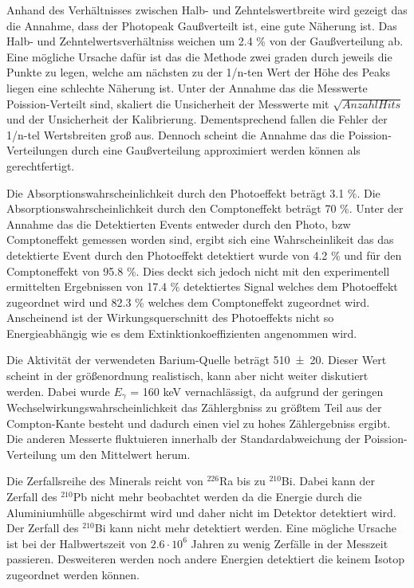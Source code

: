 Anhand des Verhältnisses zwischen Halb- und Zehntelswertbreite wird gezeigt das die Annahme, dass der Photopeak Gaußverteilt ist, eine gute Näherung ist. Das Halb- und Zehntelwertsverhältniss weichen um 2.4 \% von der Gaußverteilung ab. Eine mögliche Ursache dafür ist das die Methode zwei graden durch jeweils die Punkte zu legen, welche am nächsten zu der 1/n-ten Wert der Höhe des Peaks liegen eine schlechte Näherung ist. Unter der Annahme das die Messwerte Poission-Verteilt sind, skaliert die Unsicherheit der Messwerte mit $\sqrt{Anzahl Hits}$ und der Unsicherheit der Kalibrierung. Dementsprechend fallen die Fehler der 1/n-tel Wertsbreiten groß aus. Dennoch scheint die Annahme das die Poission-Verteilungen durch eine Gaußverteilung approximiert werden können als gerechtfertigt. 

Die Absorptionswahrscheinlichkeit durch den Photoeffekt beträgt 3.1 \%. Die Absorptionswahrscheinlichkeit durch den Comptoneffekt beträgt 70 \%. Unter der Annahme das die Detektierten Events entweder durch den Photo, bzw Comptoneffekt gemessen worden sind, ergibt sich eine Wahrscheinlikeit das das detektierte Event durch den Photoeffekt detektiert wurde von 4.2 \% und für den Comptoneffekt von 95.8 \%. Dies deckt sich jedoch nicht mit den experimentell ermittelten Ergebnissen von 17.4 \% detektiertes Signal welches dem Photoeffekt zugeordnet wird und 82.3 \% welches dem Comptoneffekt zugeordnet wird. Anscheinend ist der Wirkungsquerschnitt des Photoeffekts nicht so Energieabhängig wie es dem Extinktionkoeffizienten angenommen wird. 

Die Aktivität der verwendeten Barium-Quelle beträgt \num{510 +- 20}. Dieser Wert scheint in der größenordnung realistisch, kann aber nicht weiter diskutiert werden. Dabei wurde $E_\gamma$ = 160 keV vernachlässigt, da aufgrund der geringen Wechselwirkungswahrscheinlichkeit das Zählergbniss zu größtem Teil aus der Compton-Kante besteht und dadurch einen viel zu hohes Zählergebniss ergibt. Die anderen Messerte fluktuieren innerhalb der Standardabweichung der Poission-Verteilung um den Mittelwert herum.  

Die Zerfallsreihe des Minerals reicht von $^{226}$Ra bis zu $^{210}$Bi. Dabei kann der Zerfall des $^{210}$Pb nicht mehr beobachtet werden da die Energie durch die Aluminiumhülle abgeschirmt wird und daher nicht im Detektor detektiert wird. Der Zerfall des $^{210}$Bi kann nicht mehr detektiert werden. Eine mögliche Ursache ist bei der Halbwertszeit von $2.6 \cdot 10^6$ Jahren zu wenig Zerfälle in der Messzeit passieren. Desweiteren werden noch andere Energien detektiert die keinem Isotop zugeordnet werden können. 
